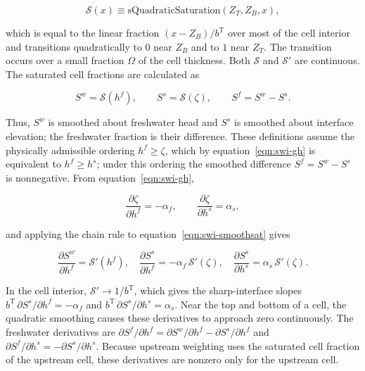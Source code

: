 \begin{equation}
\label{eqn:swi-smoothop}
\mathcal{S}(x)\equiv \mathrm{sQuadraticSaturation}(Z_{T},Z_{B},x),
\end{equation}

\noindent which is equal to the linear fraction $(x-Z_{B})/b^{\mathrm{T}}$ over most of the cell interior and transitions quadratically to $0$ near $Z_{B}$ and to $1$ near $Z_{T}$. The transition occurs over a small fraction $\Omega$ of the cell thickness. Both $\mathcal{S}$ and $\mathcal{S}'$ are continuous. The saturated cell fractions are calculated as

\begin{equation}
\label{eqn:swi-smoothsat}
S^{w}=\mathcal{S}(h^{f}),\qquad
S^{s}=\mathcal{S}(\zeta),\qquad
S^{f}=S^{w}-S^{s}.
\end{equation}

\noindent Thus, $S^{w}$ is smoothed about freshwater head and $S^{s}$ is smoothed about interface elevation; the freshwater fraction is their difference. These definitions assume the physically admissible ordering $h^{f}\ge\zeta$, which by equation~\ref{eqn:swi-gh} is equivalent to $h^{f}\ge h^{s}$; under this ordering the smoothed difference $S^{f}=S^{w}-S^{s}$ is nonnegative. From equation~\ref{eqn:swi-gh},

\begin{equation}
\label{eqn:swi-dzeta}
\frac{\partial\zeta}{\partial h^{f}}=-\alpha_{f},
\qquad
\frac{\partial\zeta}{\partial h^{s}}=\alpha_{s},
\end{equation}

\noindent and applying the chain rule to equation~\ref{eqn:swi-smoothsat} gives

\begin{equation}
\label{eqn:swi-dsat}
\frac{\partial S^{w}}{\partial h^{f}}=\mathcal{S}'(h^{f}),\quad
\frac{\partial S^{s}}{\partial h^{f}}=-\alpha_{f}\,\mathcal{S}'(\zeta),\quad
\frac{\partial S^{s}}{\partial h^{s}}=\alpha_{s}\,\mathcal{S}'(\zeta).
\end{equation}

\noindent In the cell interior, $\mathcal{S}'\to 1/b^{\mathrm{T}}$, which gives the sharp-interface slopes $b^{\mathrm{T}}\,\partial S^{s}/\partial h^{f}=-\alpha_{f}$ and $b^{\mathrm{T}}\,\partial S^{s}/\partial h^{s}=\alpha_{s}$. Near the top and bottom of a cell, the quadratic smoothing causes these derivatives to approach zero continuously. The freshwater derivatives are $\partial S^{f}/\partial h^{f}=\partial S^{w}/\partial h^{f}-\partial S^{s}/\partial h^{f}$ and $\partial S^{f}/\partial h^{s}=-\partial S^{s}/\partial h^{s}$. Because upstream weighting uses the saturated cell fraction of the upstream cell, these derivatives are nonzero only for the upstream cell.

